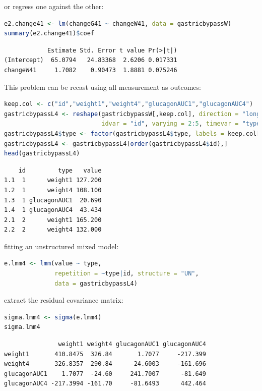 \documentclass[12pt]{article}
\begin{document}
or regress one against the other:
\begin{lstlisting}[language=r,numbers=none]
e2.change41 <- lm(changeG41 ~ changeW41, data = gastricbypassW)
summary(e2.change41)$coef
\end{lstlisting}

\label{}
\begin{verbatim}
            Estimate Std. Error t value Pr(>|t|)
(Intercept)  65.0794   24.83368  2.6206 0.017331
changeW41     1.7082    0.90473  1.8881 0.075246
\end{verbatim}


This problem can be recast using all measurement as outcomes:
\begin{lstlisting}[language=r,numbers=none]
keep.col <- c("id","weight1","weight4","glucagonAUC1","glucagonAUC4")
gastricbypassL4 <- reshape(gastricbypassW[,keep.col], direction = "long",
                           idvar = "id", varying = 2:5, timevar = "type", v.names = "value")
gastricbypassL4$type <- factor(gastricbypassL4$type, labels = keep.col[-1])
gastricbypassL4 <- gastricbypassL4[order(gastricbypassL4$id),]
head(gastricbypassL4)
\end{lstlisting}

\label{}
\begin{verbatim}
    id         type   value
1.1  1      weight1 127.200
1.2  1      weight4 108.100
1.3  1 glucagonAUC1  20.690
1.4  1 glucagonAUC4  43.434
2.1  2      weight1 165.200
2.2  2      weight4 132.000
\end{verbatim}


fitting an unstructured mixed model:
\begin{lstlisting}[language=r,numbers=none]
e.lmm4 <- lmm(value ~ type,
              repetition = ~type|id, structure = "UN",
              data = gastricbypassL4)
\end{lstlisting}

extract the residual covariance matrix:
\begin{lstlisting}[language=r,numbers=none]
sigma.lmm4 <- sigma(e.lmm4)
sigma.lmm4
\end{lstlisting}

\label{}
\begin{verbatim}
               weight1 weight4 glucagonAUC1 glucagonAUC4
weight1       410.8475  326.84       1.7077     -217.399
weight4       326.8357  290.84     -24.6003     -161.696
glucagonAUC1    1.7077  -24.60     241.7007      -81.649
glucagonAUC4 -217.3994 -161.70     -81.6493      442.464
\end{verbatim}
\end{document}
